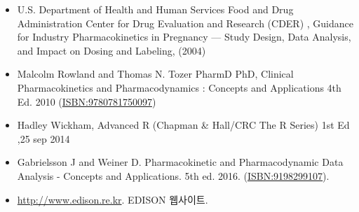 \documentclass[]{krantz}
\providecommand{\tightlist}{%
  \setlength{\itemsep}{0pt}\setlength{\parskip}{0pt}}
\theoremstyle{definition}
\theoremstyle{definition}
\theoremstyle{definition}
\theoremstyle{remark}
\begin{document}
\begin{itemize}
\tightlist
\item
  U.S. Department of Health and Human Services Food and Drug
  Administration Center for Drug Evaluation and Research (CDER) ,
  Guidance for Industry Pharmacokinetics in Pregnancy --- Study Design,
  Data Analysis, and Impact on Dosing and Labeling, (2004)
\item
  Malcolm Rowland and Thomas N. Tozer PharmD PhD, Clinical
  Pharmacokinetics and Pharmacodynamics : Concepts and Applications 4th
  Ed. 2010 (\url{ISBN:9780781750097})
\item
  Hadley Wickham, Advanced R (Chapman \& Hall/CRC The R Series) 1st Ed
  ,25 sep 2014
\item
  Gabrielsson J and Weiner D. Pharmacokinetic and Pharmacodynamic Data
  Analysis - Concepts and Applications. 5th ed. 2016.
  (\url{ISBN:9198299107}).
\item
  \url{http://www.edison.re.kr}. EDISON 웹사이트.
\end{itemize}


\end{document}
